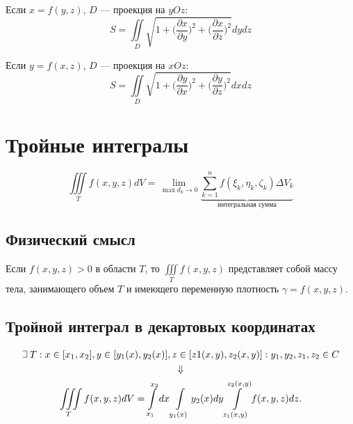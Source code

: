 \documentclass[a4paper,12pt,oneside]{extbook}
\def\lets{%
    \mathord{\setbox0=\hbox{$\exists$}%
        \hbox{\kern 0.125\wd0%
            \vbox to \ht0{%
                \hrule width 0.75\wd0%
                \vfill%
                \hrule width 0.75\wd0}%
            \vrule height \ht0%
            \kern 0.125\wd0}%
    }%
    \hspace{2pt}
}
\theoremstyle{numbered}
\theoremstyle{unnumbered}
\theoremstyle{named}
\theoremstyle{unnumbered}
\theoremstyle{named}
\theoremstyle{named}
\theoremstyle{named}
\begin{document}
Если \(x = f(y, z)\), \(D\) — проекция на \(yOz\):
\begin{equation}
    S = \iint\limits_{D} \sqrt{1 + \Big( \frac{\partial x}{\partial y} \Big)^2 + \Big( \frac{\partial x}{\partial z} \Big)^2}dydz
\end{equation}

Если \(y = f(x, z)\), \(D\) — проекция на \(xOz\):
\begin{equation}
    S = \iint\limits_{D} \sqrt{1 + \Big( \frac{\partial y}{\partial x} \Big)^2 + \Big( \frac{\partial y}{\partial z} \Big)^2}dxdz
\end{equation}

\section{Тройные интегралы}
\label{sec:Тройные интегралы}

\begin{equation*}
    \iiint\limits_{T} f(x, y, z) dV = \lim_{\max d_k \to 0} \underbrace{\sum_{k=1}^n f(\xi_k, \eta_k, \zeta_k) \Delta V_k}_\text{интегральная сумма}
\end{equation*}

\subsection{Физический смысл}
\label{sub:Физический смысл}
Если \(f(x, y, z) > 0\) в области \(T\), то \(\iiint\limits_{T} f(x, y, z)\) представляет собой массу тела, занимающего объем \(T\) и имеющего переменную плотность \(\gamma = f(x, y, z)\).

\subsection{Тройной интеграл в декартовых координатах}
\label{sub:Тройной интеграл в декартовых координатах}

\begin{equation}
    \begin{gathered}
        \lets T: x \in [x_1, x_2], y \in [y_1(x), y_2(x)], z \in [z1(x, y), z_2(x, y)]: y_1, y_2, z_1, z_2 \in C \\
        \Downarrow \\
        \iiint\limits_{T} f(x, y, z) dV = \int\limits_{x_1}^{x_2} dx \int\limits_{y_1(x)}{y_2(x)} dy \int\limits_{z_1(x, y)}^{z_2(x, y)} f(x, y, z) dz.
    \end{gathered}
\end{equation}
\end{document}
